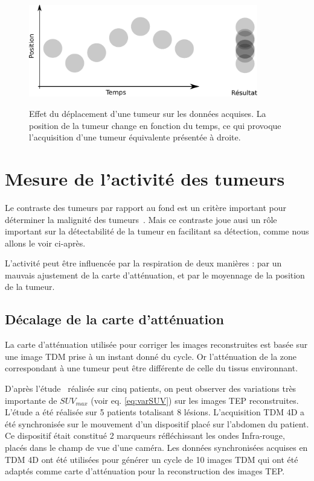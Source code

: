 \begin{figure}[h!]
    \begin{center}
            \includegraphics[width=10cm]{images/moyennageImage} \\
    \end{center}
    \caption{Effet du déplacement d'une tumeur sur les données acquises. La position de la tumeur change en fonction du temps, ce qui provoque l'acquisition d'une tumeur équivalente présentée à droite.}
    \label{fig:effetMvt}
\end{figure}


\section{Mesure de l'activité des tumeurs}

Le contraste des tumeurs par rapport au fond est un critère important pour déterminer la malignité des tumeurs~\cite{dimitrakopoulou2002role, krak2005effects}. Mais ce contraste joue ausi un rôle important sur la détectabilité de la tumeur en facilitant sa détection, comme nous allons le voir ci-après.

L'activité peut être influencée par la respiration de deux manières : par un mauvais ajustement de la carte d'atténuation, et par le moyennage de la position de la tumeur.

\subsection{Décalage de la carte d'atténuation}

La carte d'atténuation utilisée pour corriger les images reconstruites est basée sur une image TDM prise à un instant donné du cycle. Or l'atténuation de la zone correspondant à une tumeur peut être différente de celle du tissus environnant.

D'après l'étude~\cite{erdi2004ct} réalisée sur cinq patients, on peut observer des variations très importante de $SUV_{max}$ (voir eq. \ref{eq:varSUV}) sur les images TEP reconstruites. L'étude a été réalisée sur 5 patients totalisant 8 lésions. L'acquisition TDM 4D a été synchronisée sur le mouvement d'un dispositif placé sur l'abdomen du patient. Ce dispositif était constitué 2 marqueurs réfléchissant les ondes Infra-rouge, placés dans le champ de vue d'une caméra. Les données synchronisées acquises en TDM 4D ont été utilisées pour générer un cycle de 10 images TDM qui ont été adaptés comme carte d'atténuation pour la reconstruction des images TEP.

